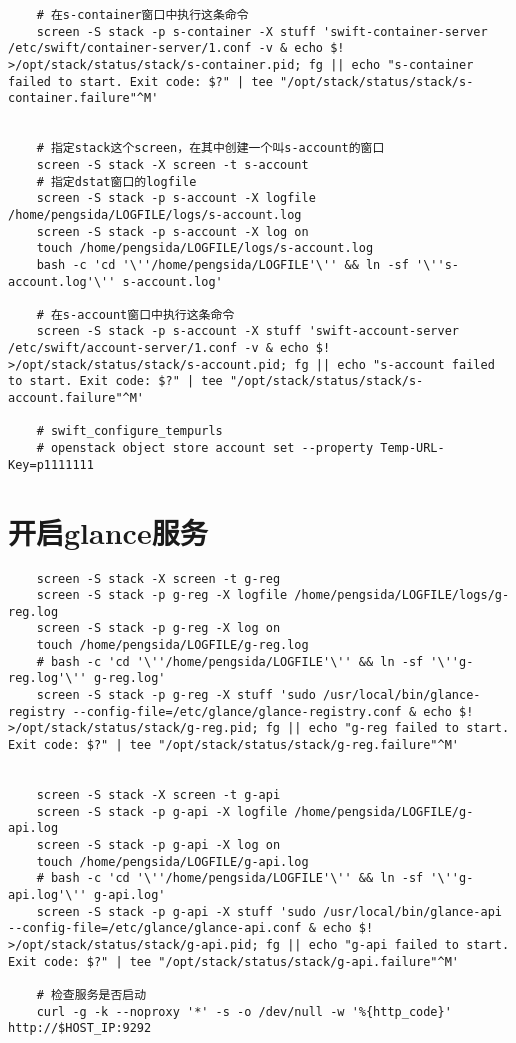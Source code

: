 \documentclass[a4paper,left=1.5cm,right=1.5cm,11pt]{article}
\begin{document}
\begin{lstlisting}
	# 在s-container窗口中执行这条命令
	screen -S stack -p s-container -X stuff 'swift-container-server /etc/swift/container-server/1.conf -v & echo $! >/opt/stack/status/stack/s-container.pid; fg || echo "s-container failed to start. Exit code: $?" | tee "/opt/stack/status/stack/s-container.failure"^M'

	
	# 指定stack这个screen，在其中创建一个叫s-account的窗口
	screen -S stack -X screen -t s-account
	# 指定dstat窗口的logfile
	screen -S stack -p s-account -X logfile /home/pengsida/LOGFILE/logs/s-account.log
    screen -S stack -p s-account -X log on
	touch /home/pengsida/LOGFILE/logs/s-account.log
    bash -c 'cd '\''/home/pengsida/LOGFILE'\'' && ln -sf '\''s-account.log'\'' s-account.log'

	# 在s-account窗口中执行这条命令
	screen -S stack -p s-account -X stuff 'swift-account-server /etc/swift/account-server/1.conf -v & echo $! >/opt/stack/status/stack/s-account.pid; fg || echo "s-account failed to start. Exit code: $?" | tee "/opt/stack/status/stack/s-account.failure"^M'

	# swift_configure_tempurls
	# openstack object store account set --property Temp-URL-Key=p1111111
	\end{lstlisting}

\section{开启glance服务}
	\begin{lstlisting}
	screen -S stack -X screen -t g-reg
	screen -S stack -p g-reg -X logfile /home/pengsida/LOGFILE/logs/g-reg.log
    screen -S stack -p g-reg -X log on
	touch /home/pengsida/LOGFILE/g-reg.log
    # bash -c 'cd '\''/home/pengsida/LOGFILE'\'' && ln -sf '\''g-reg.log'\'' g-reg.log'
	screen -S stack -p g-reg -X stuff 'sudo /usr/local/bin/glance-registry --config-file=/etc/glance/glance-registry.conf & echo $! >/opt/stack/status/stack/g-reg.pid; fg || echo "g-reg failed to start. Exit code: $?" | tee "/opt/stack/status/stack/g-reg.failure"^M'

	
	screen -S stack -X screen -t g-api
	screen -S stack -p g-api -X logfile /home/pengsida/LOGFILE/g-api.log
    screen -S stack -p g-api -X log on
	touch /home/pengsida/LOGFILE/g-api.log
    # bash -c 'cd '\''/home/pengsida/LOGFILE'\'' && ln -sf '\''g-api.log'\'' g-api.log'
	screen -S stack -p g-api -X stuff 'sudo /usr/local/bin/glance-api --config-file=/etc/glance/glance-api.conf & echo $! >/opt/stack/status/stack/g-api.pid; fg || echo "g-api failed to start. Exit code: $?" | tee "/opt/stack/status/stack/g-api.failure"^M'

	# 检查服务是否启动
	curl -g -k --noproxy '*' -s -o /dev/null -w '%{http_code}' http://$HOST_IP:9292
	\end{lstlisting}
\end{document}
